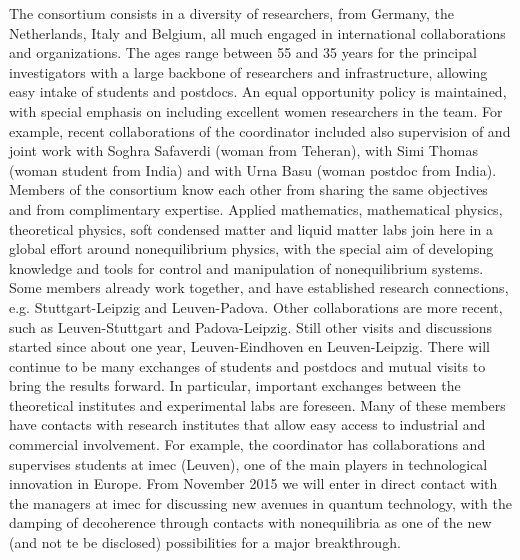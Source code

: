 The consortium consists in a diversity of researchers, from Germany, the
Netherlands, Italy and Belgium, all much engaged in international collaborations and
organizations.
%
The ages range between 55 and 35 years for the principal investigators with a large backbone
of researchers and infrastructure, allowing easy intake of students and postdocs. An equal
opportunity policy is maintained, with special emphasis on including excellent women
researchers in the team. For example, recent collaborations of the coordinator included also
supervision of and joint work with Soghra Safaverdi (woman from Teheran), with Simi Thomas
(woman student from India) and with Urna Basu (woman postdoc from India).  Members of the
consortium know each other from sharing the same objectives and from complimentary
expertise.
%
Applied mathematics, mathematical physics, theoretical physics, soft condensed matter and
liquid matter labs join here in a global effort around nonequilibrium physics, with the
special aim of developing knowledge and tools for control and manipulation of nonequilibrium
systems. Some members already work together, and have established research connections,
e.g. Stuttgart-Leipzig and Leuven-Padova.  Other collaborations are more
recent, such as Leuven-Stuttgart and Padova-Leipzig.  Still other visits and discussions
started since about one year, Leuven-Eindhoven en Leuven-Leipzig.
%
There will continue to be many exchanges of students and postdocs and mutual visits to bring
the results forward.  In particular, important exchanges between the theoretical institutes
and experimental labs are foreseen.  Many of these members have contacts with research
institutes that allow easy access to industrial and commercial involvement.  For example,
the coordinator has collaborations and supervises students at imec (Leuven), one of the main
players in technological innovation in Europe. From November 2015 we will enter in direct
contact with the managers at imec for discussing new avenues in quantum technology, with the
damping of decoherence through contacts with nonequilibria as one of the new (and not te be
disclosed) possibilities for a major breakthrough.



